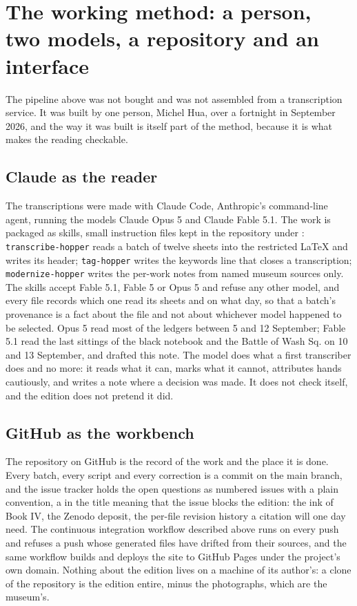 \section{The working method: a person, two models, a repository and an interface}

The pipeline above was not bought and was not assembled from a transcription service. It was built by one person, Michel Hua, over a fortnight in September 2026, and the way it was built is itself part of the method, because it is what makes the reading checkable.

\subsection*{Claude as the reader}

The transcriptions were made with Claude Code, Anthropic's command-line agent, running the models Claude Opus 5 and Claude Fable 5.1. The work is packaged as skills, small instruction files kept in the repository under : \texttt{transcribe-hopper} reads a batch of twelve sheets into the restricted LaTeX and writes its header; \texttt{tag-hopper} writes the keywords line that closes a transcription; \texttt{modernize-hopper} writes the per-work notes from named museum sources only. The skills accept Fable 5.1, Fable 5 or Opus 5 and refuse any other model, and every file records which one read its sheets and on what day, so that a batch's provenance is a fact about the file and not about whichever model happened to be selected. Opus 5 read most of the ledgers between 5 and 12 September; Fable 5.1 read the last sittings of the black notebook and the Battle of Wash Sq. on 10 and 13 September, and drafted this note. The model does what a first transcriber does and no more: it reads what it can, marks what it cannot, attributes hands cautiously, and writes a note where a decision was made. It does not check itself, and the edition does not pretend it did.

\subsection*{GitHub as the workbench}

The repository on GitHub is the record of the work and the place it is done. Every batch, every script and every correction is a commit on the main branch, and the issue tracker holds the open questions as numbered issues with a plain convention, a \q{[P1]} in the title meaning that the issue blocks the edition: the ink of Book IV, the Zenodo deposit, the per-file revision history a citation will one day need. The continuous integration workflow described above runs on every push and refuses a push whose generated files have drifted from their sources, and the same workflow builds and deploys the site to GitHub Pages under the project's own domain. Nothing about the edition lives on a machine of its author's: a clone of the repository is the edition entire, minus the photographs, which are the museum's.

